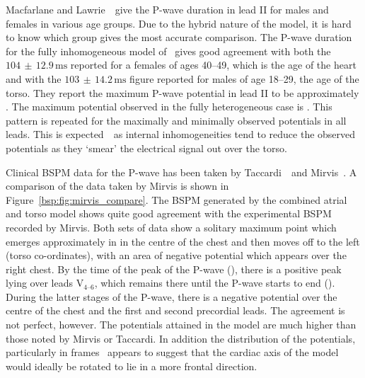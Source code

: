 Macfarlane and Lawrie~\cite{MacFarlane1989}\ give the P-wave duration in
lead II for males and females in various age groups.
Due to the hybrid nature of the model, it is hard to know which group gives the
most accurate comparison.
The P-wave duration for the fully inhomogeneous model of \ gives good
agreement with both the $104\,\pm\,12.9\,\text{ms}$ reported for a females of
ages 40--49, which is the age of the heart and with the
$103\,\pm\,14.2\,\text{ms}$ figure reported for males of age 18--29, the age of
the torso.
They report the maximum P-wave potential in lead II to be approximately
.
The maximum potential observed in the fully heterogeneous case is .
This pattern is repeated for the maximally and minimally observed potentials in
all leads.
This is expected~\cite{Rudy2006,Gulrajani1983,Gulrajani1989,Klepfer1997}\ as internal
inhomogeneities tend to reduce the observed potentials as they `smear' the
electrical signal out over the torso.

Clinical BSPM data for the P-wave has been taken by
Taccardi~\cite{Taccardi1966}\ and Mirvis~\cite{Mirvis1980}.
A comparison of the data taken by Mirvis is shown in
Figure~\ref{bsp:fig:mirvis_compare}.
The BSPM generated by the combined atrial and torso model shows quite good
agreement with the experimental BSPM recorded by Mirvis.
Both sets of data show a solitary maximum point which emerges approximately in
in the centre of the chest and then moves off to the left (torso co-ordinates),
with an area of negative potential which appears over the right chest.
By the time of the peak of the P-wave (), there is a positive peak
lying over leads $\text{V}_{\text{4--6}}$, which remains there until the P-wave
starts to end ().
During the latter stages of the P-wave, there is a negative potential over the
centre of the chest and the first and second precordial leads.
The agreement is not perfect, however.
The potentials attained in the model are much higher than those noted by Mirvis
or Taccardi.
In addition the distribution of the potentials, particularly in frames
\ appears to suggest that the cardiac axis of the model would ideally
be rotated to lie in a more frontal direction.

